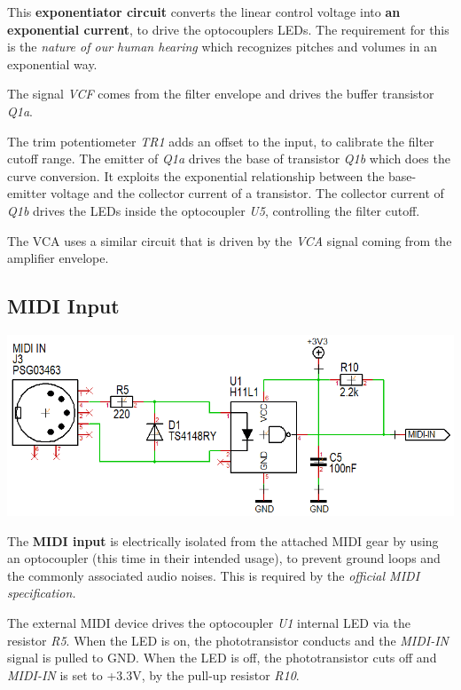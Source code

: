 \documentclass{scrartcl}
\begin{document}
This \textbf{exponentiator circuit} converts the linear control voltage into \textbf{an exponential current}, to drive the optocouplers LEDs.
The requirement for this is the \emph{nature of our human hearing} which recognizes pitches and volumes in an exponential way.

\pagebreak
The signal \emph{VCF} comes from the filter envelope and drives the buffer transistor \emph{Q1a}.

The trim potentiometer \emph{TR1} adds an offset to the input, to calibrate the filter cutoff range. The emitter of \emph{Q1a} drives the base of transistor \emph{Q1b} which does the curve conversion.
It exploits the exponential relationship between the base-emitter voltage and the collector current of a transistor.
The collector current of \emph{Q1b} drives the LEDs inside the optocoupler \emph{U5}, controlling the filter cutoff.

The VCA uses a similar circuit that is driven by the \emph{VCA} signal coming from the amplifier envelope.

\subsection{MIDI Input}

\begin{center}
    \includegraphics[scale=0.68]{assets/schema-midi.png}
\end{center}

The \textbf{MIDI input} is electrically isolated from the attached MIDI gear by using an optocoupler (this time in their intended usage), to prevent ground loops and the commonly associated audio noises.
This is required by the \emph{official MIDI specification.}

The external MIDI device drives the optocoupler \emph{U1} internal LED via the resistor \emph{R5}. When the LED is on, the phototransistor conducts and the \emph{MIDI-IN} signal is pulled to GND.
When the LED is off, the phototransistor cuts off and \emph{MIDI-IN} is set to +3.3V, by the pull-up resistor \emph{R10}.
\end{document}
